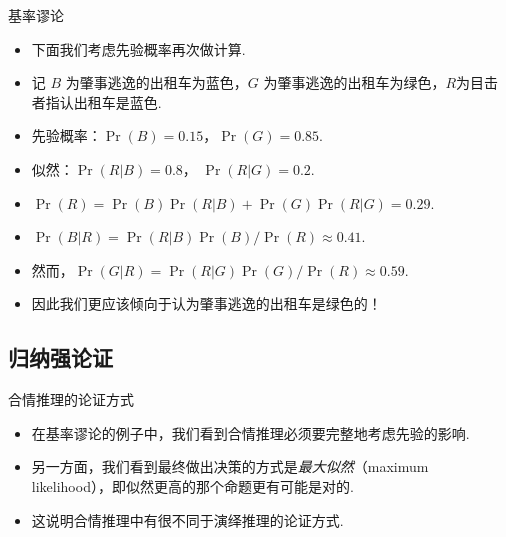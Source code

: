 {基率谬论}
    \begin{itemize}
        \item 下面我们考虑先验概率再次做计算.
        \item 记 $B$ 为肇事逃逸的出租车为蓝色，$G$ 为肇事逃逸的出租车为绿色，$R$为目击者指认出租车是蓝色.
        \item 先验概率：$\Pr(B) = 0.15$，$\Pr(G) = 0.85$.
        \item 似然：$\Pr(R|B) = 0.8$， $\Pr(R|G) = 0.2$.
        \item $\Pr(R) = \Pr(B)\Pr(R|B) + \Pr(G)\Pr(R|G)  =0.29$.
        \item $\Pr(B|R) = \Pr(R|B){\Pr(B)}/{\Pr(R)}\approx 0.41$.
        \item 然而，$\Pr(G|R) = \Pr(R|G){\Pr(G)}/{\Pr(R)}\approx 0.59$.
        \item 因此我们更应该倾向于认为肇事逃逸的出租车是绿色的！
    \end{itemize}



\subsection{归纳强论证}
{合情推理的论证方式}
\begin{itemize}
    \item 在基率谬论的例子中，我们看到合情推理必须要完整地考虑先验的影响.
    \item 另一方面，我们看到最终做出决策的方式是\emph{最大似然}（maximum likelihood），即似然更高的那个命题更有可能是对的.
    \item 这说明合情推理中有很不同于演绎推理的论证方式.
\end{itemize}



